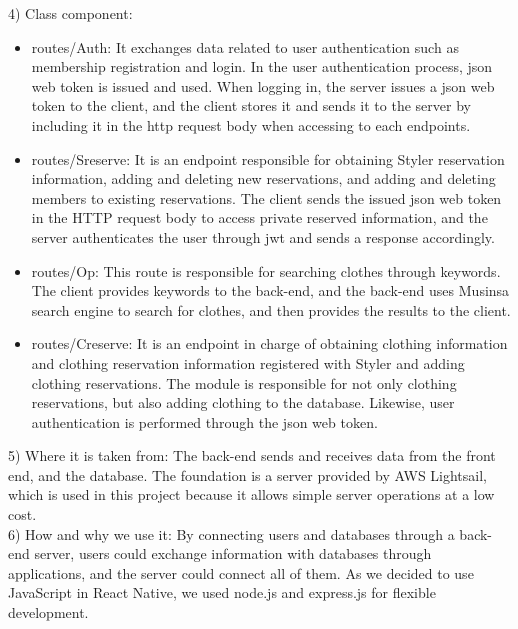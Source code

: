 \documentclass[conference]{IEEEtran}
\begin{document}
4) Class component:
\begin{itemize}
    \item routes/Auth: It exchanges data related to user authentication such as membership registration and login. In the user authentication process, json web token is issued and used. When logging in, the server issues a json web token to the client, and the client stores it and sends it to the server by including it in the http request body when accessing to each endpoints.\\
    
    \item routes/Sreserve: It is an endpoint responsible for obtaining Styler reservation information, adding and deleting new reservations, and adding and deleting members to existing reservations. The client sends the issued json web token in the HTTP request body to access private reserved information, and the server authenticates the user through jwt and sends a response accordingly.\\
    
    \item routes/Op: This route is responsible for searching clothes through keywords. The client provides keywords to the back-end, and the back-end uses Musinsa search engine to search for clothes, and then provides the results to the client.\\
    
    \item routes/Creserve: It is an endpoint in charge of obtaining clothing information and clothing reservation information registered with Styler and adding clothing reservations. The module is responsible for not only clothing reservations, but also adding clothing to the database. Likewise, user authentication is performed through the json web token.\\

\end{itemize}

5) Where it is taken from: The back-end sends and receives data from the front end, and the database. The foundation is a server provided by AWS Lightsail, which is used in this project because it allows simple server operations at a low cost.\\

6) How and why we use it: By connecting users and databases through a back-end server, users could exchange information with databases through applications, and the server could connect all of them. As we decided to use JavaScript in React Native, we used node.js and express.js for flexible development.\\
\end{document}
